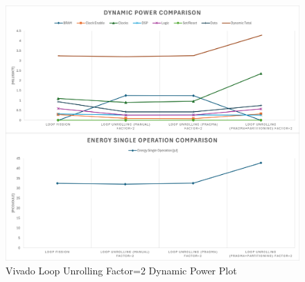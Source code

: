 \begin{figure}[H]
    \centering
    \includegraphics[width=\textwidth]{solutions/loop_unrolling/factor2/loopunrollingfactor2power.png}
    \caption{Vivado Loop Unrolling Factor=2 Dynamic Power Plot}
    \label{fig:vivado-loop-unrolling-factor2-solution-power-plot}
\end{figure}
